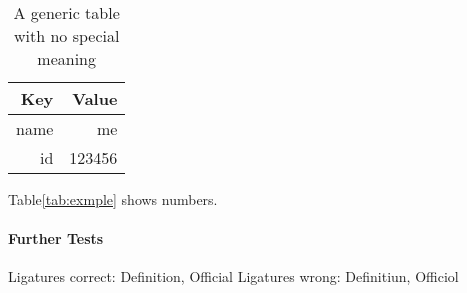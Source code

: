 \documentclass{scrartcl}
\begin{document}
\begin{table}
	\centering
    \begin{tabular}{@{}rr@{}} 
    \textbf{Key}  & \textbf{Value} \\ \hline
    name & me \\
    id & 123456\\
    \end{tabular}
    \caption{
        A generic table with no special meaning
    }
    \label{tab:example}
\end{table}



Table\ref{tab:exmple} shows numbers.



\paragraph{Further Tests}
Ligatures correct: Deﬁnition, Oﬀicial
Ligatures wrong: Deﬁnitiun, Oﬀiciol
\end{document}
